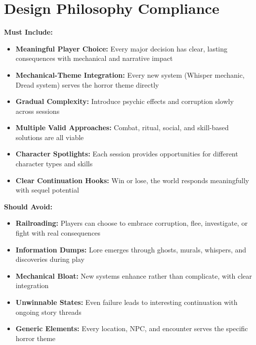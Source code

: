 \documentclass[11pt]{article}
\begin{document}
\section{Design Philosophy Compliance}

\textbf{Must Include:}
\begin{itemize}
\item \checkmark \textbf{Meaningful Player Choice:} Every major decision has clear, lasting consequences with mechanical and narrative impact
\item \checkmark \textbf{Mechanical-Theme Integration:} Every new system (Whisper mechanic, Dread system) serves the horror theme directly
\item \checkmark \textbf{Gradual Complexity:} Introduce psychic effects and corruption slowly across sessions
\item \checkmark \textbf{Multiple Valid Approaches:} Combat, ritual, social, and skill-based solutions are all viable
\item \checkmark \textbf{Character Spotlights:} Each session provides opportunities for different character types and skills
\item \checkmark \textbf{Clear Continuation Hooks:} Win or lose, the world responds meaningfully with sequel potential
\end{itemize}

\textbf{Should Avoid:}
\begin{itemize}
\item \checkmark \textbf{Railroading:} Players can choose to embrace corruption, flee, investigate, or fight with real consequences
\item \checkmark \textbf{Information Dumps:} Lore emerges through ghosts, murals, whispers, and discoveries during play
\item \checkmark \textbf{Mechanical Bloat:} New systems enhance rather than complicate, with clear integration
\item \checkmark \textbf{Unwinnable States:} Even failure leads to interesting continuation with ongoing story threads
\item \checkmark \textbf{Generic Elements:} Every location, NPC, and encounter serves the specific horror theme
\end{itemize}
\end{document}
